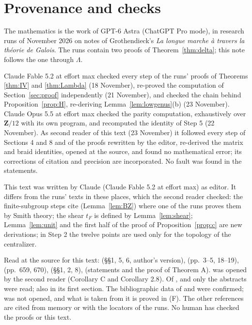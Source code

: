 \documentclass[11pt,a4paper]{article}
\theoremstyle{plain}
\theoremstyle{definition}
\theoremstyle{remark}
\newcommand{\Z}{\mathbf Z}
\begin{document}
\section*{Provenance and checks}

The mathematics is the work of GPT-6 Astra (ChatGPT Pro mode), in research runs of November 2026 on notes of
Grothendieck's \emph{La longue marche \`a travers la th\'eorie de Galois}. The runs contain two proofs of
Theorem~\ref{thm:delta}; this note follows the one through $\Lambda$.

Claude Fable 5.2 at effort max checked every step of the runs' proofs of Theorems \ref{thm:IV} and \ref{thm:Lambda}
(18 November), re-proved the computation of Section~\ref{sec:proof} independently (21 November), and checked the
chain behind Proposition~\ref{prop:H}, re-deriving Lemma~\ref{lem:lowgenus}(b) (23 November). Claude Opus 5.5 at
effort max checked the parity computation, exhaustively over $\Z/12$ with its own program, and recomputed the
identity of Step 5 (22 November). As second reader of this text (23 November) it followed every step of Sections
4 and 8 and of the proofs rewritten by the editor, re-derived the matrix and braid identities, opened
\cite{HMM} at the source, and found no mathematical error; its corrections of citation and precision are
incorporated. No fault was found in the statements.

This text was written by Claude (Claude Fable 5.2 at effort max) as editor. It differs from the runs' texts in
these places, which the second reader checked: the finite-subgroup steps cite \cite{BZ} (Lemma~\ref{lem:BZ}) where one
of the runs proves them by Smith theory; the shear $t_F$ is defined by Lemma~\ref{lem:shear}; Lemma~\ref{lem:unit}
and the first half of the proof of Proposition~\ref{prop:c} are new derivations; in Step 2 the twelve points are
used only for the topology of the centralizer.

Read at the source for this text: \cite{NS} (\S\S1, 5, 6, author's version), \cite{HLS} (pp.~3--5, 18--19),
\cite{S} (pp.~659, 670), \cite{LNS} (\S\S1, 2, 8), \cite{BZ} (statements and the proof of Theorem A). \cite{HMM} was
opened by the second reader (Corollary C and Corollary 2.8). Of \cite{BBR}, \cite{DG} and \cite{Co} only the
abstracts were read; \cite{BBR} also in its first section. The bibliographic data of \cite{As} and \cite{FR} were
confirmed; \cite{A} was not opened, and what is taken from it is proved in (F). The other references are cited
from memory or with the locators of the runs. No human has checked the proofs or this
text.
\end{document}
